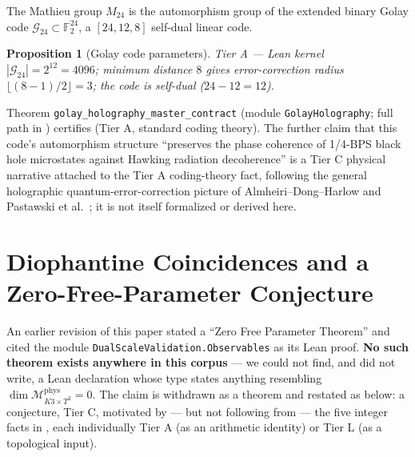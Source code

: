 \documentclass[11pt,a4paper]{article}
\newtheorem{proposition}[theorem]{Proposition}
\theoremstyle{remark}
\newcommand{\tierA}{\colorbox{green!15}{\textsf{\scriptsize Tier A --- Lean kernel}}}
\begin{document}
The Mathieu group $M_{24}$ is the automorphism group of the extended binary Golay code
$\mathcal{G}_{24}\subset\mathbb{F}_2^{24}$, a $[24,12,8]$ self-dual linear code.

\begin{proposition}[Golay code parameters] \label{prop:golay} \tierA
$|\mathcal{G}_{24}|=2^{12}=4096$; minimum distance $8$ gives error-correction radius $\lfloor
(8-1)/2\rfloor=3$; the code is self-dual ($24-12=12$).
\end{proposition}
Theorem \texttt{golay\_holography\_master\_contract} (module \texttt{GolayHolography};
full path in ) certifies
 (Tier A, standard coding theory). The further claim that this code's automorphism
structure ``preserves the phase coherence of 1/4-BPS black hole microstates against Hawking radiation
decoherence'' is a Tier C physical narrative attached to the Tier A coding-theory fact, following the
general holographic quantum-error-correction picture of Almheiri--Dong--Harlow and Pastawski et al.\
\cite{AlmheiriDongHarlow2015,PastawskiEtAl2015}; it is not itself formalized or derived here.

\section{Diophantine Coincidences and a Zero-Free-Parameter Conjecture}
\label{sec:zero-params}

An earlier revision of this paper stated a ``Zero Free Parameter Theorem'' and cited the module
\texttt{DualScaleValidation.Observables} as its Lean proof. \textbf{No such theorem exists
anywhere in this corpus} --- we could not find, and did not write, a Lean declaration whose type states
anything resembling $\dim\mathcal{M}^{\mathrm{phys}}_{K3\times T^2}=0$. The claim is withdrawn as a
theorem and restated as \Cref{conj:zeroparam} below: a conjecture, Tier C, motivated by --- but not
following from --- the five integer facts in \Cref{tab:locks}, each individually Tier A (as an
arithmetic identity) or Tier L (as a topological input).
\end{document}
